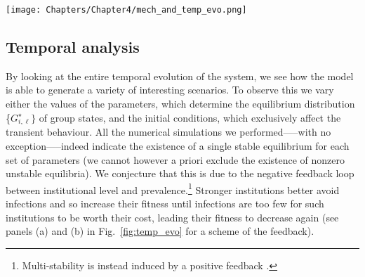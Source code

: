 \begin{figure*}[tp!]
    \centering
    \texttt{[image: Chapters/Chapter4/mech\_and\_temp\_evo.png]}
    \caption[Cross-level mechanisms and multiple scenarios from the model]{ \textbf{Cross-level mechanisms and multiple scenarios from the model.}  
    (a) Sketch of the cross-level coupling between institutions and contagions. (b) This coupling yields a negative feedback loop which generates the observed damped oscillatory dynamics. Considering either slow ($\eta=0.005$, (c, d)) or fast copying rate ($\eta=0.5$, (e, f)) and stronger ($\beta_0=0.13$, (c, e)) or weaker ($\beta_0=0.07$, (d, f)) contagions (together with different initial conditions), our model can reproduce a diversity of scenarios. Different shades of red indicate the prevalence within the different institutional levels, from $\ell=1$ (lightest shade) to $\ell=4$ (darkest shade), while the dotted line denotes the population average. Analogously, shades of blue indicate the proportion of each level. The system starts with $99\%$ of the groups at $\ell = 1$, the remaining portion being uniformly distributed among the other levels.
    (c, e) As for a new outbreak, only an infinitesimal fraction of the population is infected initially; $\beta_0 = 0.13$.
    (d, f) The initial prevalence is set equal to the equilibrium value it would attain for $\beta_0 = 0.07$ in absence of interventions (slightly less than $10\%$).
    The remaining parameters are fixed at $\rho = 0.05$, $\alpha=1$, $\gamma=1$, $b=1$, $c=1$, and $\mu = 0.0001$. Notice that, since the system exhibits a single equilibrium state for each set of parameters, this state depends on $\eta$ and $\beta_0$, but not on the initial conditions.}
    \label{fig:temp_evo}
\end{figure*}


\subsection{Temporal analysis}
\label{coevo.section.tempAnalysis}

By looking at the entire temporal evolution of the system, we see how the model is able to generate a variety of interesting scenarios. To observe this we vary either the values of the parameters, which determine the equilibrium distribution \{$G_{i,\ell}^\star\}$ of group states, and the initial conditions, which exclusively affect the transient behaviour. All the numerical simulations we performed–––with no exception–––indeed indicate the existence of a single stable equilibrium for each set of parameters (we cannot however a priori exclude the existence of nonzero unstable equilibria). We conjecture that this is due to the negative feedback loop between institutional level and prevalence.\footnote{Multi-stability is instead induced by a positive feedback \cite{hebert-dufresne_source-sink_2022}.} Stronger institutions better avoid infections and so increase their fitness until infections are too few for such institutions to be worth their cost, leading their fitness to decrease again (see panels (a) and (b) in Fig.~\ref{fig:temp_evo} for a scheme of the feedback).

